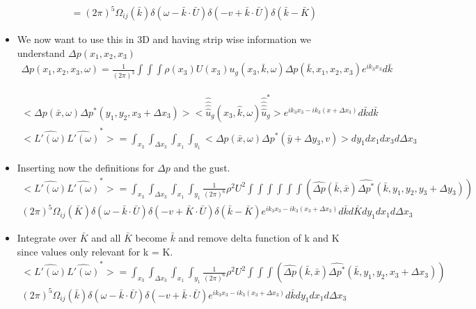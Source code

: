 \documentclass{article}
\begin{document}
\begin{itemize}
\begin{align*}
\end{align*}
\begin{align*}
\qquad = (2\pi)^5 \Omega_{ij}(\bar{k}) \delta(\omega - \bar{k}\cdot\bar{U})\delta(-v+\bar{k}\cdot\bar{U})\delta(\bar{k}-\bar{K})
\end{align*}
\item We now want to use this in 3D and having strip wise information we understand $\Delta p(x_1, x_2, x_3)$
\begin{align*}
\Delta p(x_1,x_2,x_3, \omega) = \frac{1}{(2\pi)^3} \int \int \int \rho(x_3) U(x_3) u_g(x_3,\bar{k},\omega)\hat{\Delta p}(\bar{k},x_1,x_2,x_3)e^{ik_3x_3}d\bar{k}
\end{align*}

\begin{align*}
\Big<\Delta p(\bar{x},\omega)\Delta p^*(y_1,y_2,x_3+\Delta x_3)\Big>\Big<\hat{\hat{\hat{\hat{u}}}}_g(x_3,\hat{k},\omega)\hat{\hat{\hat{\hat{u}}}}_g^*\Big> e^{ik_3x_3-ik_3(x+\Delta x_3)}d\bar{k}d\bar{k}
\end{align*}
\begin{align*}
\Big<\hat{L'(\omega)}\hat{L'(\omega)}^*\Big> = \int_{x_3} \int_{\Delta x_3} \int_{x_1} \int_{y_1} \Big<\Delta p(\bar{x},\omega)\Delta p^*(\bar{y}+\Delta y_3,v)\Big> dy_1 dx_1 dx_3 d\Delta x_3
\end{align*}
\item Inserting now the definitions for $\Delta p$ and the gust. 
\begin{align*}
\Big<\hat{L'(\omega)}\hat{L'(\omega)}^*\Big> =  \int_{x_3} \int_{\Delta x_3} \int_{x_1} \int_{y_1} \frac{1}{(2\pi)^6}\rho^2 U^2 \int \int \int \int \int \int (\hat{\Delta p}(\bar{k},\bar{x})\hat{\Delta p^*}(\bar{k},y_1,y_2,y_3 + \Delta y_3))\\(2\pi)^5 \Omega_{ij}(\bar{K})\delta(\omega - \bar{k}\cdot \bar{U})\delta(-v+\bar{K}\cdot\bar{U})\delta(\bar{k}-\bar{K})e^{ik_3x_3 - ik_3(x_3 + \Delta x_3)} d\bar{k} d\bar{K} dy_1 dx_1 d\Delta x_3
\end{align*}
\item Integrate over $\bar{K}$ and all $\bar{K}$ become $\bar{k}$ and remove delta function of k and K since values only relevant for k = K.
\begin{align*}
\Big<\hat{L'(\omega)}\hat{L'(\omega)}^*\Big> =  \int_{x_3} \int_{\Delta x_3} \int_{x_1} \int_{y_1} \frac{1}{(2\pi)^6}\rho^2 U^2 \int \int \int (\hat{\Delta p}(\bar{k},\bar{x})\hat{\Delta p^*}(\bar{k},y_1,y_2,x_3 + \Delta x_3))\\(2\pi)^5 \Omega_{ij}(\bar{k})\delta(\omega - \bar{k}\cdot \bar{U})\delta(-v+\bar{k}\cdot\bar{U})e^{ik_3x_3 - ik_3(x_3 + \Delta x_3)} d\bar{k} dy_1 dx_1 d\Delta x_3
\end{align*}


\end{itemize}
\end{document}
